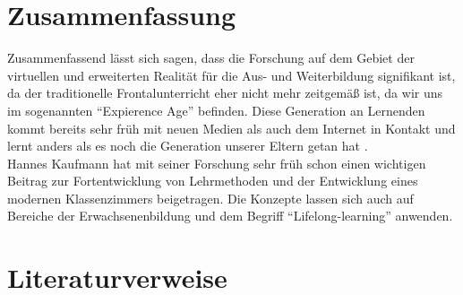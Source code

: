 \documentclass[deutsch]{llncs}
\begin{document}
\section{Zusammenfassung}
Zusammenfassend lässt sich sagen, dass die Forschung auf dem Gebiet der virtuellen und erweiterten Realität für die Aus- und Weiterbildung signifikant ist, da der traditionelle Frontalunterricht eher nicht mehr zeitgemäß ist, da wir uns im sogenannten ``Expierence Age'' befinden. Diese Generation an Lernenden kommt bereits sehr früh mit neuen Medien als auch dem Internet in Kontakt und lernt anders als es noch die Generation unserer Eltern getan hat \cite{Hu-Au}. \\
Hannes Kaufmann hat mit seiner Forschung sehr früh schon einen wichtigen Beitrag zur Fortentwicklung von Lehrmethoden und der Entwicklung eines modernen Klassenzimmers beigetragen. 
Die Konzepte lassen sich auch auf Bereiche der Erwachsenenbildung und dem Begriff ``Lifelong-learning'' anwenden. 


\section{Literaturverweise}
\label{sec:bib}

\label{subsec:bibtex}

\printbibliography
\end{document}
